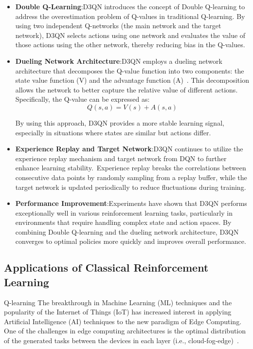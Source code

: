 \documentclass[journal]{IEEEtran}
\begin{document}
\begin{itemize}
\item \textbf{Double Q-Learning}:D3QN introduces the concept of Double Q-learning to address the overestimation problem of Q-values in traditional Q-learning. By using two independent Q-networks (the main network and the target network), D3QN selects actions using one network and evaluates the value of those actions using the other network, thereby reducing bias in the Q-values.
\item \textbf{Dueling Network Architecture}:D3QN employs a dueling network architecture that decomposes the Q-value function into two components: the state value function (V) and the advantage function (A)~\cite{pyyz002}. This decomposition allows the network to better capture the relative value of different actions. Specifically, the Q-value can be expressed as: \begin{equation}
    \mathit{Q}(s, a) = \mathit{V}(s) + \mathit{A}(s, a)
\end{equation}

By using this approach, D3QN provides a more stable learning signal, especially in situations where states are similar but actions differ.
\item \textbf{Experience Replay and Target Network}:D3QN continues to utilize the experience replay mechanism and target network from DQN to further enhance learning stability.~\cite{pyyz003}Experience replay breaks the correlations between consecutive data points by randomly sampling from a replay buffer, while the target network is updated periodically to reduce fluctuations during training.
\item \textbf{Performance Improvement}:Experiments have shown that D3QN performs exceptionally well in various reinforcement learning tasks, particularly in environments that require handling complex state and action spaces. By combining Double Q-learning and the dueling network architecture, D3QN converges to optimal policies more quickly and improves overall performance.
\end{itemize}

\subsection{Applications of Classical Reinforcement Learning}
Q-learning The breakthrough in Machine Learning (ML) techniques and the popularity of the Internet of Things (IoT) has increased interest in applying Artificial Intelligence (AI) techniques to the new paradigm of Edge Computing. One of the challenges in edge computing architectures is the optimal distribution of the generated tasks between the devices in each layer (i.e., cloud-fog-edge)~\cite{pyyz004}.
\end{document}
